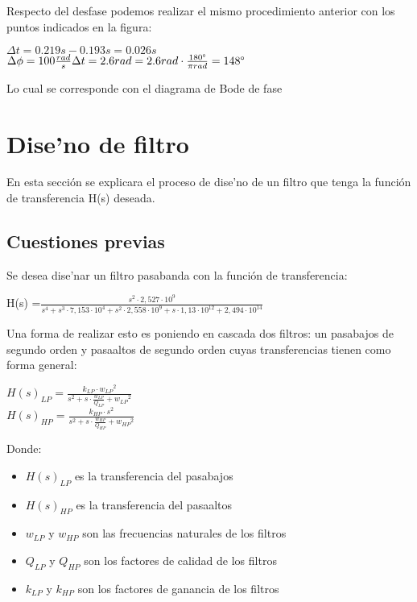 \documentclass[12pt, titlepage]{article}
\begin{document}
    Respecto del desfase podemos realizar el mismo procedimiento anterior con los puntos indicados en la figura:
    
     \begin{center}
        $\Delta t = 0.219s - 0.193s = 0.026s$\\
        $\Delta\phi = 100\frac{rad}{s} \Delta t = 2.6rad = 2.6rad\cdot\frac{180\degree}{\pi rad}= 148\degree$
    \end{center}
    
    Lo cual se corresponde con el diagrama de Bode de fase
    
    \newpage
    
    \section{Dise'no de filtro}
    
    En esta sección se explicara el proceso de dise'no de un filtro que tenga la función de transferencia H(s) deseada.
    
    \subsection{Cuestiones previas}
    Se desea dise'nar un filtro pasabanda con la función de transferencia:
    \begin{center}
        H(s) =$\frac{s^2 \cdot 2,527 \cdot 10^9}{s^4 + s^3 \cdot 7,153 \cdot 10^4 + s^2 \cdot 2,558 \cdot 10^9  +s \cdot 1,13\cdot 10^{12} +2,494 \cdot 10^{14} }$
    \end{center}
   Una forma de realizar esto es poniendo en cascada dos filtros: un pasabajos de segundo orden y pasaaltos de segundo orden cuyas transferencias tienen como forma general:
   \begin{center}
       $H(s)_{LP} = \frac{k_{LP}\cdot {w_{LP}}^2}{s^2 + s\cdot\frac{w_{LP}}{Q_{LP}} + {w_{LP}}^2}$\\
       $H(s)_{HP} = \frac{k_{HP}\cdot s^2}{s^2 + s\cdot\frac{w_{HP}}{Q_{HP}} + {w_{HP}}^2}$
   \end{center}
    Donde:
    \begin{itemize}
        \item $H(s)_{LP}$ es la transferencia del pasabajos
        \item $H(s)_{HP}$ es la transferencia del pasaaltos
        \item $w_{LP}$ y $w_{HP}$ son las frecuencias naturales de  los filtros
        \item $Q_{LP}$ y $Q_{HP}$ son los factores de calidad de los filtros
        \item $k_{LP}$ y $k_{HP}$ son los factores de ganancia de los filtros
    \end{itemize}
    
\end{document}
